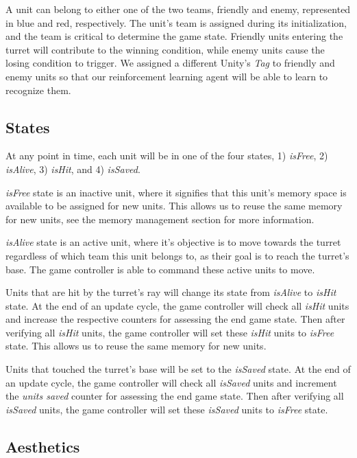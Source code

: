 \documentclass[conference]{IEEEtran}
\begin{document}
A unit can belong to either one of the two teams, friendly and enemy, represented in blue and red, respectively. The unit's team is assigned during its initialization, and the team is critical to determine the game state. Friendly units entering the turret will contribute to the winning condition, while enemy units cause the losing condition to trigger. We assigned a different Unity's \textit{Tag} to friendly and enemy units so that our reinforcement learning agent will be able to learn to recognize them. 

\subsection{States}

At any point in time, each unit will be in one of the four states, 1) \textit{isFree}, 2) \textit{isAlive}, 3) \textit{isHit}, and 4) \textit{isSaved}.

\textit{isFree} state is an inactive unit, where it signifies that this unit's memory space is available to be assigned for new units. This allows us to reuse the same memory for new units, see the memory management section for more information. 

\textit{isAlive} state is an active unit, where it's objective is to move towards the turret regardless of which team this unit belongs to, as their goal is to reach the turret's base. The game controller is able to command these active units to move.

Units that are hit by the turret's ray will change its state from \textit{isAlive} to \textit{isHit} state. At the end of an update cycle, the game controller will check all \textit{isHit} units and increase the respective counters for assessing the end game state. Then after verifying all \textit{isHit} units, the game controller will set these \textit{isHit} units to \textit{isFree} state. This allows us to reuse the same memory for new units.

Units that touched the turret's base will be set to the \textit{isSaved} state. At the end of an update cycle, the game controller will check all \textit{isSaved} units and increment the \textit{units saved} counter for assessing the end game state. Then after verifying all \textit{isSaved} units, the game controller will set these \textit{isSaved} units to \textit{isFree} state.

\subsection{Aesthetics}
\end{document}
